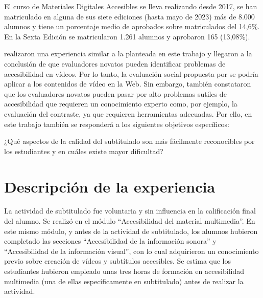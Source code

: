 \documentclass[
  12pt,
  a4paper,
  extrafontsizes,
  onecolumn,
  openright,
  table]{memoir}
\begin{document}
El curso de Materiales Digitales Accesibles se lleva realizando desde
2017, se han matriculado en alguna de sus siete ediciones (hasta mayo de
2023) más de 8.000 alumnos y tiene un porcentaje medio de aprobados
sobre matriculados del 14,6\%. En la Sexta Edición se matricularon 1.261
alumnos y aprobaron 165 (13,08\%).

\textcite{jperez2} realizaron una experiencia similar a la planteada en
este trabajo y llegaron a la conclusión de que evaluadores novatos
pueden identificar problemas de accesibilidad en vídeos. Por lo tanto,
la evaluación social propuesta por \textcite{kawanaka2008} se podría
aplicar a los contenidos de vídeo en la Web. Sin embargo, también
constataron que los evaluadores novatos pueden pasar por alto problemas
sutiles de accesibilidad que requieren un conocimiento experto como, por
ejemplo, la evaluación del contraste, ya que requieren herramientas
adecuadas. Por ello, en este trabajo también se responderá a los
siguientes objetivos específicos:

\begin{tcolorbox}[enhanced jigsaw, colback=white, toptitle=1mm, opacityback=0, title=\textcolor{quarto-callout-tip-color}{\faLightbulb}\hspace{0.5em}{Objetivos específicos}, coltitle=black, bottomrule=.15mm, bottomtitle=1mm, colbacktitle=quarto-callout-tip-color!10!white, toprule=.15mm, titlerule=0mm, left=2mm, breakable, colframe=quarto-callout-tip-color-frame, rightrule=.15mm, arc=.35mm, opacitybacktitle=0.6, leftrule=.75mm]

¿Qué aspectos de la calidad del subtitulado son más fácilmente
reconocibles por los estudiantes y en cuáles existe mayor dificultad?

\end{tcolorbox}

\hypertarget{descripciuxf3n-de-la-experiencia}{%
\section{Descripción de la
experiencia}\label{descripciuxf3n-de-la-experiencia}}

La actividad de subtitulado fue voluntaria y sin influencia en la
calificación final del alumno. Se realizó en el módulo
\enquote{Accesibilidad del material multimedia}. En este mismo módulo, y
antes de la actividad de subtitulado, los alumnos hubieron completado
las secciones \enquote{Accesibilidad de la información sonora} y
\enquote{Accesibilidad de la información visual}, con lo cual
adquirieron un conocimiento previo sobre creación de vídeos y subtítulos
accesibles. Se estima que los estudiantes hubieron empleado unas tres
horas de formación en accesibilidad multimedia (una de ellas
específicamente en subtitulado) antes de realizar la actividad.
\end{document}
